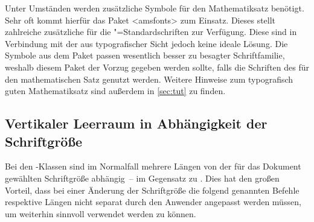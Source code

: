 \begin{Declaration*}{}
\begin{Declaration*}{}
\begin{Declaration*}{}
\begin{Declaration}{}
\begin{Declaration}{}
\begin{Declaration}{}
\begin{Declaration}{}
\begin{Declaration}{}
\begin{Declaration}{}
\begin{Declaration}{}
\begin{Declaration}{}
\begin{Declaration}{}
\begin{Declaration}{}
\begin{Declaration}{}
\begin{Declaration}{}
\begin{Declaration}{}
\begin{Declaration}{}
\end{Declaration}
\end{Declaration}
\end{Declaration}
\end{Declaration}
\end{Declaration}
\end{Declaration}
\end{Declaration}
\end{Declaration}
\end{Declaration}
\end{Declaration}
\end{Declaration}
\end{Declaration}
\end{Declaration}
\end{Declaration}



Unter Umständen werden zusätzliche Symbole für den Mathematiksatz benötigt. 
Sehr oft kommt hierfür das Paket <amsfonts> zum Einsatz. 
Dieses stellt zahlreiche zusätzliche für die "=Standardschriften 
zur Verfügung. Diese sind in Verbindung mit der \OpenSans aus typografischer 
Sicht jedoch keine ideale Lösung. Die Symbole aus dem Paket  
passen wesentlich besser zu besagter Schriftfamilie, weshalb diesem Paket der 
Vorzug gegeben werden sollte, falls die Schriften des \CDs für den 
mathematischen Satz genutzt werden. Weitere Hinweise zum typografisch guten 
Mathematiksatz sind außerdem in \autoref{sec:tut} zu finden.
%


\subsection{Vertikaler Leerraum in Abhängigkeit der Schriftgröße}
%
%
%
Bei den \TUDScript-Klassen sind im Normalfall mehrere Längen von der für das 
Dokument gewählten Schriftgröße abhängig~-- im Gegensatz zu \KOMAScript. Dies 
hat den großen Vorteil, dass bei einer Änderung der Schriftgröße die folgend 
genannten Befehle respektive Längen nicht separat durch den Anwender angepasst 
werden müssen, um weiterhin sinnvoll verwendet werden zu können.


\end{Declaration*}
\end{Declaration*}
\end{Declaration*}

